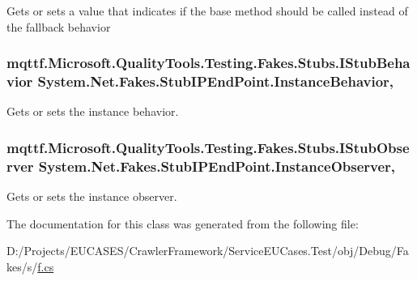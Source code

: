 Gets or sets a value that indicates if the base method should be called instead of the fallback behavior

\hypertarget{class_system_1_1_net_1_1_fakes_1_1_stub_i_p_end_point_add5821d9613606d1a2f5d1b63557b7d4}{
\subsubsection[{Instance\-Behavior}]{\setlength{\rightskip}{0pt plus 5cm}mqttf.\-Microsoft.\-Quality\-Tools.\-Testing.\-Fakes.\-Stubs.\-I\-Stub\-Behavior System.\-Net.\-Fakes.\-Stub\-I\-P\-End\-Point.\-Instance\-Behavior\hspace{0.3cm}{\ttfamily [get]}, {\ttfamily [set]}}}\label{class_system_1_1_net_1_1_fakes_1_1_stub_i_p_end_point_add5821d9613606d1a2f5d1b63557b7d4}


Gets or sets the instance behavior.

\hypertarget{class_system_1_1_net_1_1_fakes_1_1_stub_i_p_end_point_a3fe786f344f54ab3e30479264c7ecdd9}{
\subsubsection[{Instance\-Observer}]{\setlength{\rightskip}{0pt plus 5cm}mqttf.\-Microsoft.\-Quality\-Tools.\-Testing.\-Fakes.\-Stubs.\-I\-Stub\-Observer System.\-Net.\-Fakes.\-Stub\-I\-P\-End\-Point.\-Instance\-Observer\hspace{0.3cm}{\ttfamily [get]}, {\ttfamily [set]}}}\label{class_system_1_1_net_1_1_fakes_1_1_stub_i_p_end_point_a3fe786f344f54ab3e30479264c7ecdd9}


Gets or sets the instance observer.



The documentation for this class was generated from the following file\-:\begin{DoxyCompactItemize}
\item 
D\-:/\-Projects/\-E\-U\-C\-A\-S\-E\-S/\-Crawler\-Framework/\-Service\-E\-U\-Cases.\-Test/obj/\-Debug/\-Fakes/s/\hyperlink{s_2f_8cs}{f.\-cs}\end{DoxyCompactItemize}
